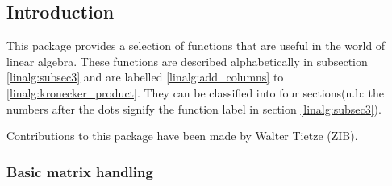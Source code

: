 
\newcommand\exprlist  {expr$_{1}$,expr$_{2}$, \ldots ,expr$_{{\tt n}}$}
\newcommand\lineqlist {lin\_eqn$_{1}$,lin\_eqn$_{2}$, \ldots ,lin\_eqn$_{n}$}
\newcommand\matlist   {mat$_{1}$,mat$_{2}$, \ldots ,mat$_{n}$}
\newcommand\veclist   {vec$_{1}$,vec$_{2}$, \ldots ,vec$_{n}$}

\newcommand\lazyfootnote{\footnote{If you're feeling lazy then the \{\}'s can
                  be omitted.}}


\setcounter{secnumdepth}{3}


\subsection{Introduction}

This package provides a selection of functions that are useful in the world of
linear algebra. These functions are described alphabetically in subsection
\ref{linalg:subsec3} and are labelled \ref{linalg:add_columns} to
\ref{linalg:kronecker_product}.  They can be classified into four sections(n.b:
the numbers after the dots signify the function label in section
\ref{linalg:subsec3}).

Contributions to this package have been made by Walter Tietze (ZIB).

\subsubsection{Basic matrix handling}


